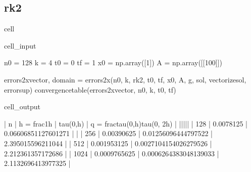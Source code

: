 \documentclass[letterpaper,10pt,english]{jupyterBook}
\begin{document}
\subsection{rk2}
\label{\detokenize{appendix:rk2}}
\begin{sphinxuseclass}{cell}\begin{sphinxVerbatimInput}

\begin{sphinxuseclass}{cell_input}
\begin{sphinxVerbatim}[commandchars=\\\{\}]
n0 = 128
k = 4
t0 = 0
tf = 1
x0 = np.array([1])
A = np.array([[100]])

errors\PYGZus{}2x\PYGZus{}vector, domain = errors\PYGZus{}2x(n0, k, rk2, t0, tf, x0, A, g, sol, vectorize\PYGZus{}sol, error\PYGZus{}sup)
convergence\PYGZus{}table(errors\PYGZus{}2x\PYGZus{}vector, n0, k, t0, tf)
\end{sphinxVerbatim}

\end{sphinxuseclass}\end{sphinxVerbatimInput}
\begin{sphinxVerbatimOutput}

\begin{sphinxuseclass}{cell_output}
\begin{sphinxVerbatim}[commandchars=\\\{\}]
| n | h = \PYGZdl{}\PYGZbs{}frac\PYGZob{}1\PYGZcb{}\PYGZob{}h\PYGZcb{}\PYGZdl{} | \PYGZdl{}\PYGZbs{}tau(0,h)\PYGZdl{} | q = \PYGZdl{}\PYGZbs{}frac\PYGZob{}tau(0,h)\PYGZcb{}\PYGZob{}tau(0, 2h)\PYGZcb{}\PYGZdl{} |
|\PYGZhy{}\PYGZhy{}\PYGZhy{}|\PYGZhy{}\PYGZhy{}\PYGZhy{}\PYGZhy{}\PYGZhy{}\PYGZhy{}\PYGZhy{}\PYGZhy{}\PYGZhy{}\PYGZhy{}\PYGZhy{}\PYGZhy{}\PYGZhy{}\PYGZhy{}\PYGZhy{}\PYGZhy{}\PYGZhy{}|\PYGZhy{}\PYGZhy{}\PYGZhy{}\PYGZhy{}\PYGZhy{}\PYGZhy{}\PYGZhy{}\PYGZhy{}\PYGZhy{}\PYGZhy{}\PYGZhy{}|\PYGZhy{}\PYGZhy{}\PYGZhy{}\PYGZhy{}\PYGZhy{}\PYGZhy{}\PYGZhy{}\PYGZhy{}\PYGZhy{}\PYGZhy{}\PYGZhy{}\PYGZhy{}\PYGZhy{}\PYGZhy{}\PYGZhy{}\PYGZhy{}\PYGZhy{}\PYGZhy{}\PYGZhy{}\PYGZhy{}\PYGZhy{}\PYGZhy{}\PYGZhy{}\PYGZhy{}\PYGZhy{}\PYGZhy{}\PYGZhy{}\PYGZhy{}\PYGZhy{}\PYGZhy{}\PYGZhy{}\PYGZhy{}\PYGZhy{}|
 | 128 | 0.0078125 | 0.06606851127601271 | \PYGZhy{} | 
 | 256 | 0.00390625 | 0.01256096444797522 | 2.395015596211044 | 
 | 512 | 0.001953125 | 0.0027104154026279526 | 2.212361357172686 | 
 | 1024 | 0.0009765625 | 0.0006264383048139033 | 2.1132696413977325 | 
\end{sphinxVerbatim}

\end{sphinxuseclass}\end{sphinxVerbatimOutput}

\end{sphinxuseclass}
\end{document}
